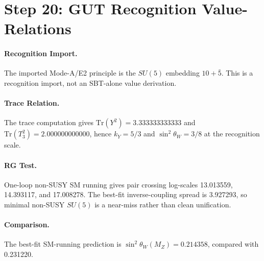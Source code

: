 \section{Step 20: GUT Recognition Value-Relations}

\paragraph{Recognition Import.}
The imported Mode-A/E2 principle is the \(SU(5)\) embedding \(10+\bar{5}\). This is a recognition import, not an SBT-alone value derivation.

\paragraph{Trace Relation.}
The trace computation gives \(\mathrm{Tr}(Y^2)=3.333333333333\) and \(\mathrm{Tr}(T_3^2)=2.000000000000\), hence \(k_Y=5/3\) and \(\sin^2\theta_W=3/8\) at the recognition scale.

\paragraph{RG Test.}
One-loop non-SUSY SM running gives pair crossing log-scales 13.013559, 14.393117, and 17.008278. The best-fit inverse-coupling spread is 3.927293, so minimal non-SUSY \(SU(5)\) is a near-miss rather than clean unification.

\paragraph{Comparison.}
The best-fit SM-running prediction is \(\sin^2\theta_W(M_Z)=0.214358\), compared with 0.231220.
